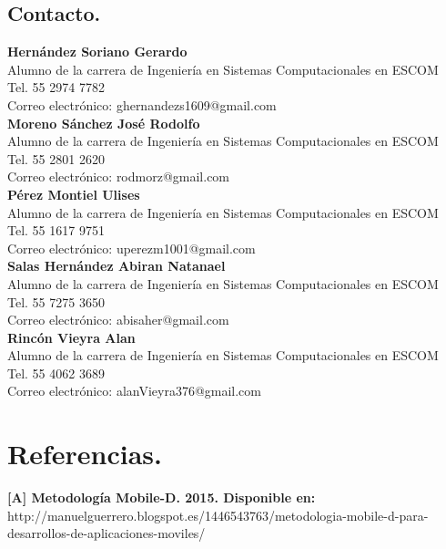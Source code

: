 \subsection{Contacto.}

\textbf{Hernández Soriano Gerardo}\\
Alumno de la carrera de Ingeniería en Sistemas Computacionales en ESCOM\\
Tel. 55 2974 7782\\
Correo electrónico: ghernandezs1609@gmail.com\\

\textbf{Moreno Sánchez José Rodolfo} \\
Alumno de la carrera de Ingeniería en Sistemas Computacionales en ESCOM\\
Tel. 55 2801 2620 \\
Correo electrónico: rodmorz@gmail.com \\

\textbf{Pérez Montiel Ulises} \\
Alumno de la carrera de Ingeniería en Sistemas Computacionales en ESCOM\\
Tel. 55 1617 9751 \\
Correo electrónico: uperezm1001@gmail.com\\

\textbf{Salas Hernández Abiran Natanael}\\
Alumno de la carrera de Ingeniería en Sistemas Computacionales en ESCOM\\
Tel. 55 7275 3650\\
Correo electrónico: abisaher@gmail.com\\

\textbf{Rincón Vieyra Alan}\\
Alumno de la carrera de Ingeniería en Sistemas Computacionales en ESCOM\\
Tel. 55 4062 3689\\
Correo electrónico: alanVieyra376@gmail.com
\newpage
\section{Referencias.}
\textbf{[A] Metodología Mobile-D. 2015. Disponible en:}\\ http://manuelguerrero.blogspot.es/1446543763/metodologia-mobile-d-para-desarrollos-de-aplicaciones-moviles/
